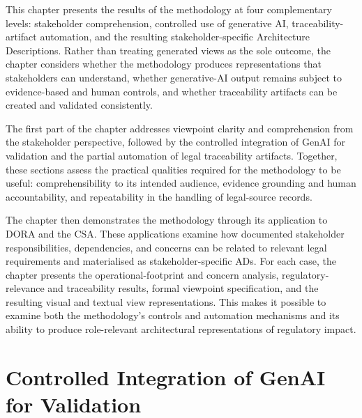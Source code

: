 \label{chap:demo}

\label{chap:res}
This chapter presents the results of the methodology at four complementary levels: stakeholder comprehension, controlled use of generative AI, traceability-artifact automation, and the resulting stakeholder-specific Architecture Descriptions. Rather than treating generated views as the sole outcome, the chapter considers whether the methodology produces representations that stakeholders can understand, whether generative-AI output remains subject to evidence-based and human controls, and whether traceability artifacts can be created and validated consistently.

The first part of the chapter addresses viewpoint clarity and comprehension from the stakeholder perspective, followed by the controlled integration of \ac{GenAI} for validation and the partial automation of legal traceability artifacts. Together, these sections assess the practical qualities required for the methodology to be useful: comprehensibility to its intended audience, evidence grounding and human accountability, and repeatability in the handling of legal-source records.

The chapter then demonstrates the methodology through its application to \ac{DORA} and the \ac{CSA}. These applications examine how documented stakeholder responsibilities, dependencies, and concerns can be related to relevant legal requirements and materialised as stakeholder-specific \acp{AD}. For each case, the chapter presents the operational-footprint and concern analysis, regulatory-relevance and traceability results, formal viewpoint specification, and the resulting visual and textual view representations. This makes it possible to examine both the methodology's controls and automation mechanisms and its ability to produce role-relevant architectural representations of regulatory impact.
 
\section{Controlled Integration of GenAI for Validation}

